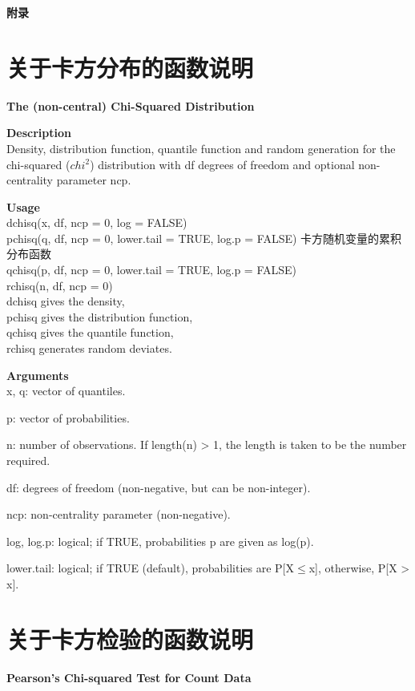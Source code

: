 \documentclass[11pt,a4paper]{ctexart}
\begin{document}
\newpage
\centering\textbf{\Large 附录}
\begin{appendices}


\section{关于卡方分布的函数说明}
\begin{tcolorbox}[colback=blue!7!white,colframe=blue!40]
\textbf{The (non-central) Chi-Squared Distribution}

\textbf{Description}\\
Density, distribution function, quantile function and random generation for the chi-squared ($chi^2$) distribution with df degrees of freedom and optional non-centrality parameter ncp.

\textbf{Usage}\\
dchisq(x, df, ncp = 0, log = FALSE)\\
pchisq(q, df, ncp = 0, lower.tail = TRUE, log.p = FALSE) 卡方随机变量的累积分布函数\\
qchisq(p, df, ncp = 0, lower.tail = TRUE, log.p = FALSE)\\
rchisq(n, df, ncp = 0)\\


dchisq gives the density, \\
pchisq gives the distribution function, \\
qchisq gives the quantile function, \\
rchisq generates random deviates.

\textbf{Arguments}\\
x, q:	vector of quantiles.

p:	vector of probabilities.

n:	number of observations. If length(n) > 1, the length is taken to be the number required.

df:	degrees of freedom (non-negative, but can be non-integer).

ncp:	non-centrality parameter (non-negative).

log, log.p:	logical; if TRUE, probabilities p are given as log(p).

lower.tail:	logical; if TRUE (default), probabilities are P[X$ \leq $x], otherwise, P[X > x].
\end{tcolorbox}

\section{关于卡方检验的函数说明}
\begin{tcolorbox}[colback=blue!7!white,colframe=blue!40]
\textbf{Pearson's Chi-squared Test for Count Data}


\end{tcolorbox}
\end{appendices}
\end{document}
